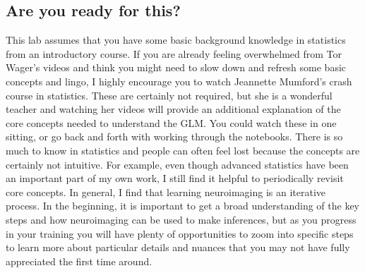 \documentclass[letterpaper,10pt,english]{sphinxmanual}
\begin{document}
\subsection{Are you ready for this?}
\label{\detokenize{content/GLM:are-you-ready-for-this}}
This lab assumes that you have some basic background knowledge in statistics from an introductory course. If you are already feeling overwhelmed from Tor Wager’s videos and think you might need to slow down and refresh some basic concepts and lingo, I highly encourage you to watch Jeannette Mumford’s crash course in statistics. These are certainly not required, but she is a wonderful teacher and watching her videos will provide an additional explanation of the core concepts needed to understand the GLM. You could watch these in one sitting, or go back and forth with working through the notebooks. There is so much to know in statistics and people can often feel lost because the concepts are certainly not intuitive. For example, even though advanced statistics have been an important part of my own work, I still find it helpful to periodically revisit core concepts. In general, I find that learning neuroimaging is an iterative process. In the beginning, it is important to get a broad understanding of the key steps and how neuroimaging can be used to make inferences, but as you progress in your training you will have plenty of opportunities to zoom into specific steps to learn more about particular details and nuances that you may not have fully appreciated the first time around.
\end{document}
